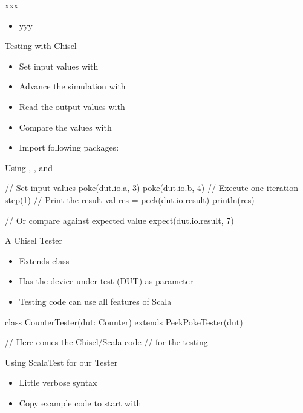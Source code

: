 \begin{frame}[fragile]{xxx}
\begin{itemize}
\item yyy
\end{itemize}
\end{frame}

\begin{frame}[fragile]{Testing with Chisel}
\begin{itemize}
\item Set input values with 
\item Advance the simulation with 
\item Read the output values with 
\item Compare the values with 
\item Import following packages:
\end{itemize}
\end{frame}

\begin{frame}[fragile]{Using , , and }
\begin{chisel}
// Set input values
poke(dut.io.a, 3)
poke(dut.io.b, 4)
// Execute one iteration
step(1)
// Print the result
val res = peek(dut.io.result)
println(res)

// Or compare against expected value
expect(dut.io.result, 7)
\end{chisel}
\end{frame}

\begin{frame}[fragile]{A Chisel Tester}
\begin{itemize}
\item Extends class 
\item Has the device-under test (DUT) as parameter
\item Testing code can use all features of Scala
\end{itemize}
\begin{chisel}
class CounterTester(dut: Counter) extends PeekPokeTester(dut) {

  // Here comes the Chisel/Scala code
  // for the testing
}
\end{chisel}
\end{frame}

\begin{frame}[fragile]{Using ScalaTest for our Tester}
\begin{itemize}
\item Little verbose syntax
\item Copy example code to start with
\end{itemize}
\end{frame}

